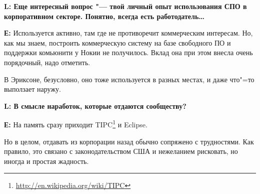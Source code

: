 \documentclass[10pt, a5paper]{article}
\begin{document}
{\noindent \bf L: Еще интересный вопрос "--- твой личный опыт использования СПО в корпоративном секторе. Понятно, всегда есть работодатель\ldots}

{\noindent \bf Е:} Используется активно, там где не противоречит коммерческим интересам. Но, как мы знаем, построить коммерческую систему на базе свободного ПО и поддержки
комьюнити у Нокии не получилось. Вклад она при этом внесла очень порядочный, надо отметить.

В Эриксоне, безусловно, оно тоже используется в разных местах, и даже что"=то выползает наружу. 

{\noindent \bf L: В смысле наработок, которые отдаются сообществу?}

{\noindent \bf Е:} На память сразу приходит TIPC\footnote{\url{http://en.wikipedia.org/wiki/TIPC}} и Eclipse.

Но в целом, отдавать из корпорации назад обычно сопряжено с трудностями. Как правило, это связано с законодательством США и нежеланием рисковать, но иногда и простая жадность.
\end{document}

